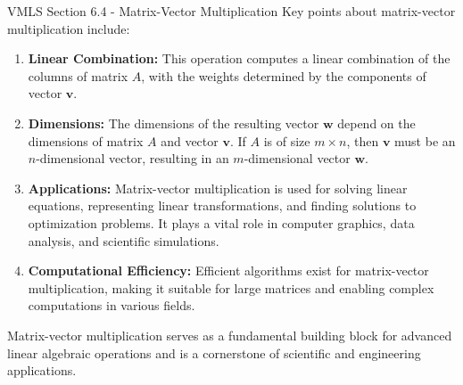 \begin{notes}{VMLS Section 6.4 - Matrix-Vector Multiplication}
    Key points about matrix-vector multiplication include:

    \begin{enumerate}
        \item \textbf{Linear Combination:} This operation computes a linear combination of the columns of matrix $A$, with the weights determined by the components of vector $\mathbf{v}$.
        
        \item \textbf{Dimensions:} The dimensions of the resulting vector $\mathbf{w}$ depend on the dimensions of matrix $A$ and vector $\mathbf{v}$. If $A$ is of size $m \times n$, then $\mathbf{v}$ 
        must be an $n$-dimensional vector, resulting in an $m$-dimensional vector $\mathbf{w}$.
        
        \item \textbf{Applications:} Matrix-vector multiplication is used for solving linear equations, representing linear transformations, and finding solutions to optimization problems. It plays a 
        vital role in computer graphics, data analysis, and scientific simulations.
        
        \item \textbf{Computational Efficiency:} Efficient algorithms exist for matrix-vector multiplication, making it suitable for large matrices and enabling complex computations in various fields.
    \end{enumerate}

    Matrix-vector multiplication serves as a fundamental building block for advanced linear algebraic operations and is a cornerstone of scientific and engineering applications.
\end{notes}
